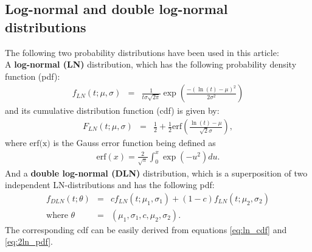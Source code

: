 \documentclass[twoside,11pt]{article}
\begin{document}



\begin{appendix}
\section{Log-normal and double log-normal distributions}
\label{sec:densities}\noindent
The following two probability distributions have been used in this article:\\
A \textbf{log-normal (LN)} distribution, which has the following
  probability density function (pdf):
\begin{eqnarray}
  f_{LN}(t;\mu,\sigma)&=&
  \frac{1}{t\sigma\sqrt{2\pi}}\exp\left(\frac{-(\ln(t)-\mu)^2}{2\sigma^2}\right)
\label{eq:ln_pdf}
\end{eqnarray}
and its cumulative distribution function (cdf) is given by:
\begin{eqnarray}
  F_{LN}(t;\mu,\sigma)&=&\frac{1}{2}+\frac{1}{2}\mbox{erf}\left(\frac{\ln(t)-\mu}{\sqrt{2}\sigma}\right),
\label{eq:ln_cdf}
\end{eqnarray}
where $\mbox{erf(x)}$ is the Gauss error function
being defined as
\begin{eqnarray}
  \mbox{erf}(x)=\frac{2}{\sqrt{\pi}}\int_0^x\exp(-u^2)du.
\label{eq:erf}
\end{eqnarray}
And a \textbf{double log-normal (DLN)} distribution, which is a superposition
  of two independent LN-distributions and has the following pdf:
\begin{eqnarray}
  f_{DLN}(t;\theta)&=&
  c f_{LN}(t;\mu_1,\sigma_1)+(1-c)f_{LN}(t;\mu_2,\sigma_2) \label{eq:2ln_pdf}\\
\mbox{where } \theta&=&(\mu_1,\sigma_1,c,\mu_2,\sigma_2)\nonumber.
\end{eqnarray}
The corresponding cdf can be easily derived from equations \eqref{eq:ln_cdf} and \eqref{eq:2ln_pdf}.

\end{appendix}
\end{document}
